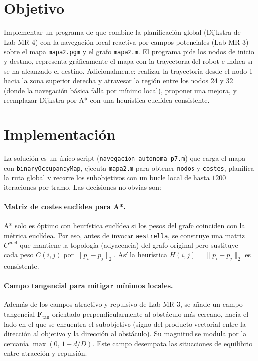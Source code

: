 \section{Objetivo}
Implementar un programa de \matlab{} que combine la planificaci\'{o}n global (Dijkstra de Lab-MR 4) con la navegaci\'{o}n local reactiva por campos potenciales (Lab-MR 3) sobre el mapa \texttt{mapa2.pgm} y el grafo \texttt{mapa2.m}. El programa pide los nodos de inicio y destino, representa gr\'{a}ficamente el mapa con la trayectoria del robot e indica si se ha alcanzado el destino. Adicionalmente: realizar la trayectoria desde el nodo 1 hacia la zona superior derecha y atravesar la regi\'{o}n entre los nodos 24 y 32 (donde la navegaci\'{o}n b\'{a}sica falla por m\'{i}nimo local), proponer una mejora, y reemplazar Dijkstra por A* con una heur\'{i}stica eucl\'{i}dea consistente.


\section{Implementaci\'{o}n}

La soluci\'{o}n es un \'{u}nico script (\texttt{navegacion\_autonoma\_p7.m}) que carga el mapa con \texttt{binaryOccupancyMap}, ejecuta \texttt{mapa2.m} para obtener \texttt{nodos} y \texttt{costes}, planifica la ruta global y recorre los subobjetivos con un bucle local de hasta $1200$ iteraciones por tramo. Las decisiones no obvias son:

\paragraph{Matriz de costes eucl\'{i}dea para A*.} A* solo es \'{o}ptimo con heur\'{i}stica eucl\'{i}dea si los pesos del grafo coinciden con la m\'{e}trica eucl\'{i}dea. Por eso, antes de invocar \texttt{aestrella}, se construye una matriz $C^{\text{eucl}}$ que mantiene la topolog\'{i}a (adyacencia) del grafo original pero sustituye cada peso $C(i,j)$ por $\lVert p_i - p_j\rVert_2$. As\'{i} la heur\'{i}stica $H(i,j) = \lVert p_i - p_j\rVert_2$ es consistente.

\paragraph{Campo tangencial para mitigar m\'{i}nimos locales.} Adem\'{a}s de los campos atractivo y repulsivo de Lab-MR 3, se a\~{n}ade un campo tangencial $\mathbf{F}_\text{tan}$ orientado perpendicularmente al obst\'{a}culo m\'{a}s cercano, hacia el lado en el que se encuentra el subobjetivo (signo del producto vectorial entre la direcci\'{o}n al objetivo y la direcci\'{o}n al obst\'{a}culo). Su magnitud se modula por la cercan\'{i}a $\max(0,\, 1 - d/D)$. Este campo desempata las situaciones de equilibrio entre atracci\'{o}n y repulsi\'{o}n.

